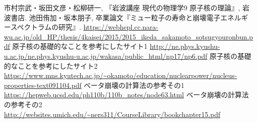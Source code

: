 \documentclass[a4paper,11pt,titlepage,uplatex]{jsarticle}
\begin{document}
\begin{thebibliography}{9}
	 市村宗武・坂田文彦・松柳研一, 『岩波講座 現代の物理学9 原子核の理論』, 岩波書店.
	 池田侑加・坂本朋子, 卒業論文『ミュー粒子の寿命と崩壊電子エネルギースペクトラムの研究』. \url{https://webhepl.cc.nara-wu.ac.jp/old_HP/thesis/4kaisei/2015/2015_ikeda_sakamoto_sotsugyouronbun.pdf}
	 原子核の基礎的なことを参考にしたサイト1 \url{http://ne.phys.kyushu-u.ac.jp/ne.phys.kyushu-u.ac.jp/wakasa/public_html/np17/np6.pdf}
	 原子核の基礎的なことを参考にしたサイト2 \url{https://www.mns.kyutech.ac.jp/~okamoto/education/nuclearpower/nucleus-properties-text091104.pdf}
	 ベータ崩壊の計算法の参考その1 \url{https://hepweb.ucsd.edu/ph110b/110b_notes/node63.html}
	 ベータ崩壊の計算法の参考その2 \url{http://websites.umich.edu/~ners311/CourseLibrary/bookchapter15.pdf}
\end{thebibliography}
\end{document}
